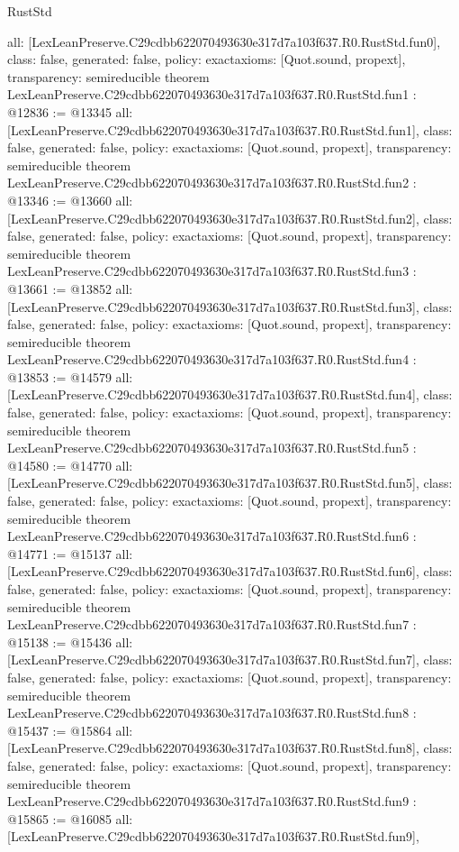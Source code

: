 \begin{lexlean}{RustStd}
\begin{coremodule}
{  all: [LexLeanPreserve.C29cdbb622070493630e317d7a103f637.R0.RustStd.fun0],
  class: false,
  generated: false,
  policy: exact{axioms: [Quot.sound, propext]},
  transparency: semireducible
}
theorem LexLeanPreserve.C29cdbb622070493630e317d7a103f637.R0.RustStd.fun1 : @12836 := @13345 {
  all: [LexLeanPreserve.C29cdbb622070493630e317d7a103f637.R0.RustStd.fun1],
  class: false,
  generated: false,
  policy: exact{axioms: [Quot.sound, propext]},
  transparency: semireducible
}
theorem LexLeanPreserve.C29cdbb622070493630e317d7a103f637.R0.RustStd.fun2 : @13346 := @13660 {
  all: [LexLeanPreserve.C29cdbb622070493630e317d7a103f637.R0.RustStd.fun2],
  class: false,
  generated: false,
  policy: exact{axioms: [Quot.sound, propext]},
  transparency: semireducible
}
theorem LexLeanPreserve.C29cdbb622070493630e317d7a103f637.R0.RustStd.fun3 : @13661 := @13852 {
  all: [LexLeanPreserve.C29cdbb622070493630e317d7a103f637.R0.RustStd.fun3],
  class: false,
  generated: false,
  policy: exact{axioms: [Quot.sound, propext]},
  transparency: semireducible
}
theorem LexLeanPreserve.C29cdbb622070493630e317d7a103f637.R0.RustStd.fun4 : @13853 := @14579 {
  all: [LexLeanPreserve.C29cdbb622070493630e317d7a103f637.R0.RustStd.fun4],
  class: false,
  generated: false,
  policy: exact{axioms: [Quot.sound, propext]},
  transparency: semireducible
}
theorem LexLeanPreserve.C29cdbb622070493630e317d7a103f637.R0.RustStd.fun5 : @14580 := @14770 {
  all: [LexLeanPreserve.C29cdbb622070493630e317d7a103f637.R0.RustStd.fun5],
  class: false,
  generated: false,
  policy: exact{axioms: [Quot.sound, propext]},
  transparency: semireducible
}
theorem LexLeanPreserve.C29cdbb622070493630e317d7a103f637.R0.RustStd.fun6 : @14771 := @15137 {
  all: [LexLeanPreserve.C29cdbb622070493630e317d7a103f637.R0.RustStd.fun6],
  class: false,
  generated: false,
  policy: exact{axioms: [Quot.sound, propext]},
  transparency: semireducible
}
theorem LexLeanPreserve.C29cdbb622070493630e317d7a103f637.R0.RustStd.fun7 : @15138 := @15436 {
  all: [LexLeanPreserve.C29cdbb622070493630e317d7a103f637.R0.RustStd.fun7],
  class: false,
  generated: false,
  policy: exact{axioms: [Quot.sound, propext]},
  transparency: semireducible
}
theorem LexLeanPreserve.C29cdbb622070493630e317d7a103f637.R0.RustStd.fun8 : @15437 := @15864 {
  all: [LexLeanPreserve.C29cdbb622070493630e317d7a103f637.R0.RustStd.fun8],
  class: false,
  generated: false,
  policy: exact{axioms: [Quot.sound, propext]},
  transparency: semireducible
}
theorem LexLeanPreserve.C29cdbb622070493630e317d7a103f637.R0.RustStd.fun9 : @15865 := @16085 {
  all: [LexLeanPreserve.C29cdbb622070493630e317d7a103f637.R0.RustStd.fun9],
}
\end{coremodule}
\end{lexlean}
